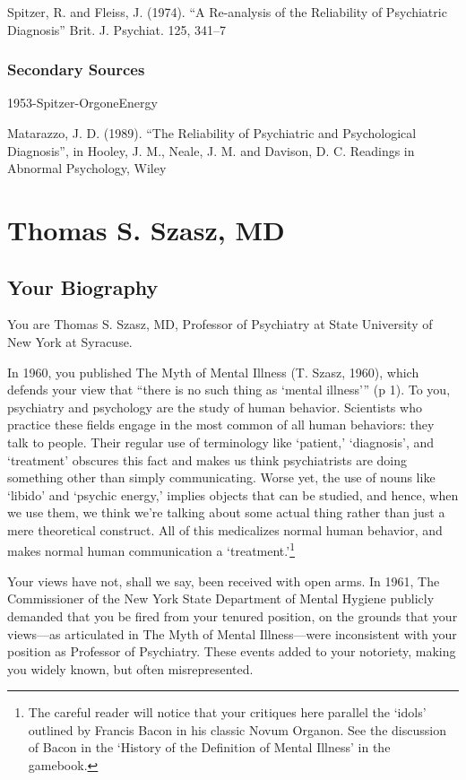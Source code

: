 \begin{refsection}
Spitzer, R. and Fleiss, J. (1974). ``A Re-analysis of the Reliability of Psychiatric Diagnosis'' Brit. J. Psychiat. 125, 341--7

\subsection{Secondary Sources}
\label{secondarysources}

1953-Spitzer-OrgoneEnergy

Matarazzo, J. D. (1989). ``The Reliability of Psychiatric and Psychological Diagnosis'', in Hooley, J. M., Neale, J. M. and Davison, D. C. Readings in Abnormal Psychology, Wiley

\chapter{Thomas S. Szasz, MD}
\label{thomass.szaszmd}

\section{Your Biography}
\label{yourbiography}

You are Thomas S. Szasz, MD, Professor of Psychiatry at State University of New York at Syracuse.

In 1960, you published The Myth of Mental Illness (T. Szasz, 1960), which defends your view that ``there is no such thing as `mental illness''' (p 1). To you, psychiatry and psychology are the study of human behavior. Scientists who practice these fields engage in the most common of all human behaviors: they talk to people. Their regular use of terminology like `patient,' `diagnosis', and `treatment' obscures this fact and makes us think psychiatrists are doing something other than simply communicating. Worse yet, the use of nouns like `libido' and `psychic energy,' implies objects that can be studied, and hence, when we use them, we think we're talking about some actual thing rather than just a mere theoretical construct. All of this medicalizes normal human behavior, and makes normal human communication a `treatment.'\footnote{The careful reader will notice that your critiques here parallel the `idols' outlined by Francis Bacon in his classic Novum Organon. See the discussion of Bacon in the `History of the Definition of Mental Illness' in the gamebook.} 

Your views have not, shall we say, been received with open arms. In 1961, The Commissioner of the New York State Department of Mental Hygiene publicly demanded that you be fired from your tenured position, on the grounds that your views---as articulated in The Myth of Mental Illness---were inconsistent with your position as Professor of Psychiatry. These events added to your notoriety, making you widely known, but often misrepresented.


\end{refsection}
